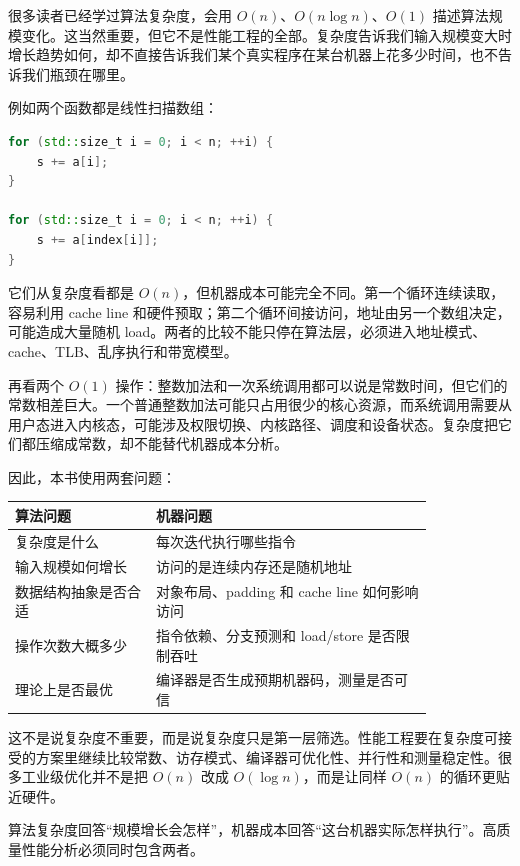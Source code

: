 很多读者已经学过算法复杂度，会用 $O(n)$、$O(n \log n)$、$O(1)$ 描述算法规模变化。这当然重要，但它不是性能工程的全部。复杂度告诉我们输入规模变大时增长趋势如何，却不直接告诉我们某个真实程序在某台机器上花多少时间，也不告诉我们瓶颈在哪里。

例如两个函数都是线性扫描数组：

\begin{lstlisting}[language=C++]
for (std::size_t i = 0; i < n; ++i) {
    s += a[i];
}

for (std::size_t i = 0; i < n; ++i) {
    s += a[index[i]];
}
\end{lstlisting}

它们从复杂度看都是 $O(n)$，但机器成本可能完全不同。第一个循环连续读取，容易利用 cache line 和硬件预取；第二个循环间接访问，地址由另一个数组决定，可能造成大量随机 load。两者的比较不能只停在算法层，必须进入地址模式、cache、TLB、乱序执行和带宽模型。

再看两个 $O(1)$ 操作：整数加法和一次系统调用都可以说是常数时间，但它们的常数相差巨大。一个普通整数加法可能只占用很少的核心资源，而系统调用需要从用户态进入内核态，可能涉及权限切换、内核路径、调度和设备状态。复杂度把它们都压缩成常数，却不能替代机器成本分析。

因此，本书使用两套问题：

\begin{center}
\begin{tabular}{p{0.28\linewidth}p{0.55\linewidth}}
\toprule
算法问题 & 机器问题 \\
\midrule
复杂度是什么 & 每次迭代执行哪些指令 \\
输入规模如何增长 & 访问的是连续内存还是随机地址 \\
数据结构抽象是否合适 & 对象布局、padding 和 cache line 如何影响访问 \\
操作次数大概多少 & 指令依赖、分支预测和 load/store 是否限制吞吐 \\
理论上是否最优 & 编译器是否生成预期机器码，测量是否可信 \\
\bottomrule
\end{tabular}
\end{center}

这不是说复杂度不重要，而是说复杂度只是第一层筛选。性能工程要在复杂度可接受的方案里继续比较常数、访存模式、编译器可优化性、并行性和测量稳定性。很多工业级优化并不是把 $O(n)$ 改成 $O(\log n)$，而是让同样 $O(n)$ 的循环更贴近硬件。

\begin{keyidea}
算法复杂度回答“规模增长会怎样”，机器成本回答“这台机器实际怎样执行”。高质量性能分析必须同时包含两者。
\end{keyidea}

